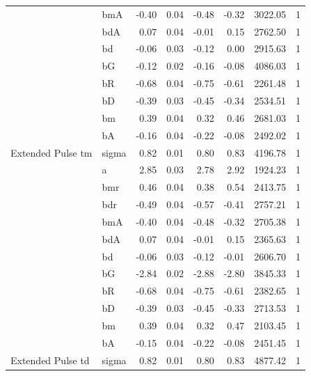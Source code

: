 \documentclass[11pt]{article}
\begin{document}
\begin{table}[H]
\begin{tabular}[t]{l|l|r|r|r|r|r|r}
 & bmA & -0.40 & 0.04 & -0.48 & -0.32 & 3022.05 & 1\\

 & bdA & 0.07 & 0.04 & -0.01 & 0.15 & 2762.50 & 1\\

 & bd & -0.06 & 0.03 & -0.12 & 0.00 & 2915.63 & 1\\

 & bG & -0.12 & 0.02 & -0.16 & -0.08 & 4086.03 & 1\\

 & bR & -0.68 & 0.04 & -0.75 & -0.61 & 2261.48 & 1\\

 & bD & -0.39 & 0.03 & -0.45 & -0.34 & 2534.51 & 1\\

 & bm & 0.39 & 0.04 & 0.32 & 0.46 & 2681.03 & 1\\

 & bA & -0.16 & 0.04 & -0.22 & -0.08 & 2492.02 & 1\\

\multirow{-12}{*}{\raggedright\arraybackslash Extended Pulse tm} & sigma & 0.82 & 0.01 & 0.80 & 0.83 & 4196.78 & 1\\
\cline{1-8}
 & a & 2.85 & 0.03 & 2.78 & 2.92 & 1924.23 & 1\\

 & bmr & 0.46 & 0.04 & 0.38 & 0.54 & 2413.75 & 1\\

 & bdr & -0.49 & 0.04 & -0.57 & -0.41 & 2757.21 & 1\\

 & bmA & -0.40 & 0.04 & -0.48 & -0.32 & 2705.38 & 1\\

 & bdA & 0.07 & 0.04 & -0.01 & 0.15 & 2365.63 & 1\\

 & bd & -0.06 & 0.03 & -0.12 & -0.01 & 2606.70 & 1\\

 & bG & -2.84 & 0.02 & -2.88 & -2.80 & 3845.33 & 1\\

 & bR & -0.68 & 0.04 & -0.75 & -0.61 & 2382.65 & 1\\

 & bD & -0.39 & 0.03 & -0.45 & -0.33 & 2713.53 & 1\\

 & bm & 0.39 & 0.04 & 0.32 & 0.47 & 2103.45 & 1\\

 & bA & -0.15 & 0.04 & -0.22 & -0.08 & 2451.45 & 1\\

\multirow{-12}{*}{\raggedright\arraybackslash Extended Pulse td} & sigma & 0.82 & 0.01 & 0.80 & 0.83 & 4877.42 & 1\\
\hline
\end{tabular}
\end{table}
\end{document}
